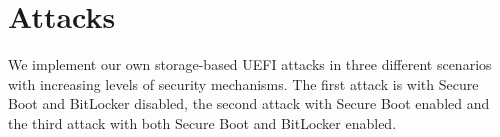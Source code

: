 
\chapter{Attacks}
\label{sec:attacks}

We implement our own storage-based \ac{UEFI} attacks in three different scenarios with increasing levels of security mechanisms.
The first attack is with Secure Boot and BitLocker disabled, the second attack with Secure Boot enabled and the third attack with both Secure Boot and BitLocker enabled.



